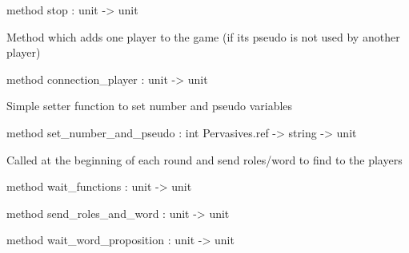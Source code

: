 \documentclass[11pt]{article}
\begin{document}
\begin{ocamldocobjectend}
\begin{ocamldocdescription}
\end{ocamldocdescription}


\label{method:Server2.player.stop}\begin{ocamldoccode}
method stop : unit -> unit
\end{ocamldoccode}
\begin{ocamldocdescription}
Method which adds one player to the game (if its pseudo is not used by another player)


\end{ocamldocdescription}


\label{method:Server2.player.connection-underscoreplayer}\begin{ocamldoccode}
method connection_player : unit -> unit
\end{ocamldoccode}
\begin{ocamldocdescription}
Simple setter function to set number and pseudo variables


\end{ocamldocdescription}


\label{method:Server2.player.set-underscorenumber-underscoreand-underscorepseudo}\begin{ocamldoccode}
method set_number_and_pseudo : int Pervasives.ref -> string -> unit
\end{ocamldoccode}
\begin{ocamldocdescription}
Called at the beginning of each round and send roles/word to find to the players


\end{ocamldocdescription}


\label{method:Server2.player.wait-underscorefunctions}\begin{ocamldoccode}
method wait_functions : unit -> unit
\end{ocamldoccode}


\label{method:Server2.player.send-underscoreroles-underscoreand-underscoreword}\begin{ocamldoccode}
method send_roles_and_word : unit -> unit
\end{ocamldoccode}


\label{method:Server2.player.wait-underscoreword-underscoreproposition}\begin{ocamldoccode}
method wait_word_proposition : unit -> unit
\end{ocamldoccode}



\end{ocamldocobjectend}
\end{document}
